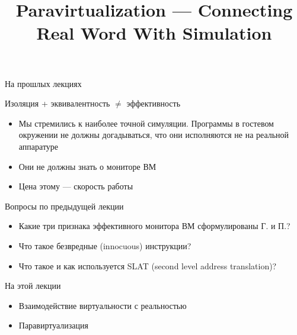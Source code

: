 
\title{Paravirtualization --- Connecting Real Word With Simulation}



\startslides

\begin{frame}{На прошлых лекциях}

Изоляция + эквивалентность $\neq$ эффективность

\begin{itemize}
\item Мы стремились к наиболее точной симуляции. Программы в гостевом окружении не должны догадываться, что они исполняются не на реальной аппаратуре
\item Они не должны знать о мониторе ВМ
\item Цена этому — скорость работы

\end{itemize}

\end{frame}

\begin{frame}{Вопросы по предыдущей лекции}

\begin{itemize}
\item Какие три признака эффективного монитора ВМ сформулированы Г. и П.?
\item Что такое безвредные (innocuous) инструкции?
\item Что такое и как используется SLAT (second level address translation)?


\end{itemize}

\end{frame}

\begin{frame}{На этой лекции}

\begin{itemize}
\item Взаимодействие виртуальности с реальностью
\item Паравиртуализация 
\end{itemize}

\end{frame}

